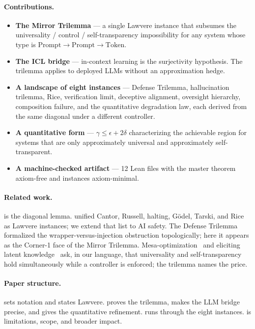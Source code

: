 \paragraph{Contributions.}
\begin{itemize}\itemsep2pt
  \item \textbf{The Mirror Trilemma} --- a single Lawvere instance that subsumes the universality / control / self-transparency impossibility for any system whose type is $\mathrm{Prompt} \to \mathrm{Prompt} \to \mathrm{Token}$.
  \item \textbf{The ICL bridge} --- in-context learning is the surjectivity hypothesis. The trilemma applies to deployed LLMs without an approximation hedge.
  \item \textbf{A landscape of eight instances} --- Defense Trilemma, hallucination trilemma, Rice, verification limit, deceptive alignment, oversight hierarchy, composition failure, and the quantitative degradation law, each derived from the same diagonal under a different controller.
  \item \textbf{A quantitative form} --- $\gamma \le \epsilon + 2\delta$ characterizing the achievable region for systems that are only approximately universal and approximately self-transparent.
  \item \textbf{A machine-checked artifact} --- 12 Lean files with the master theorem axiom-free and instances axiom-minimal.
\end{itemize}

\paragraph{Related work.}
\citet{lawvere1969} is the diagonal lemma. \citet{yanofsky2003} unified Cantor, Russell, halting, G\"odel, Tarski, and Rice as Lawvere instances; we extend that list to AI safety. The Defense Trilemma~\citep{anonymous2025defense} formalized the wrapper-versus-injection obstruction topologically; here it appears as the Corner-1 face of the Mirror Trilemma. Mesa-optimization~\citep{hubinger2019mesa} and eliciting latent knowledge~\citep{christiano2021eliciting} ask, in our language, that universality and self-transparency hold simultaneously while a controller is enforced; the trilemma names the price.

\paragraph{Paper structure.}
 sets notation and states Lawvere.  proves the trilemma, makes the LLM bridge precise, and gives the quantitative refinement.  runs through the eight instances.  is limitations, scope, and broader impact.
